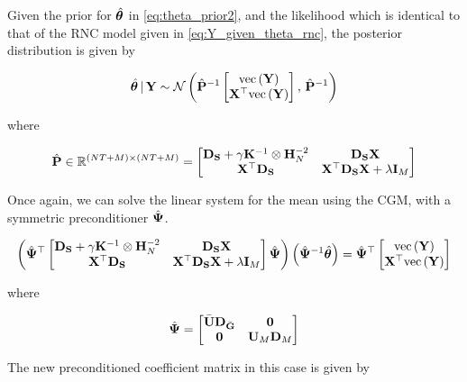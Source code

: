 Given the prior for $\hat{\boldsymbol{\theta}}$ in \cref{eq:theta_prior2}, and the likelihood which is identical to that of the RNC model given in \cref{eq:Y_given_theta_rnc}, the posterior distribution is given by 

\begin{equation}
    \hat{\boldsymbol{\theta}} \, | \, \mathbf{Y} \sim \mathcal{N}\left(\hat{\mathbf{P}}^{-1} \begin{bmatrix} \text{\textup{vec}}\left(\mathbf{Y}\right) \\ \mathbf{X}^\top \text{\textup{vec}}\left(\mathbf{Y}\right) \end{bmatrix}, \, \hat{\mathbf{P}}^{-1}\right)
\end{equation}

where 

\begin{equation}
    \hat{\mathbf{P}} \in \mathbb{R}^{(NT + M) \times (NT + M)}= 
    \begin{bmatrix}
     \mathbf{D}_{\mathbf{S}} + \gamma \mathbf{K}^{-1} \otimes \mathbf{H}_N^{-2} & \mathbf{D}_{\mathbf{S}}  \mathbf{X} \\
     \mathbf{X}^\top \mathbf{D}_{\mathbf{S}} & \mathbf{X}^\top \mathbf{D}_{\mathbf{S}} \mathbf{X} + \lambda \mathbf{I}_M   
    \end{bmatrix}
\end{equation}

Once again, we can solve the linear system for the mean using the CGM, with a symmetric preconditioner $\hat{\mathbf{\Psi}}$.  

\begin{equation}
    \left( \hat{\mathbf{\Psi}}^\top \begin{bmatrix}
        \mathbf{D}_{\mathbf{S}} + \gamma \mathbf{K}^{-1} \otimes \mathbf{H}_N^{-2} & \mathbf{D}_{\mathbf{S}}  \mathbf{X} \\
        \mathbf{X}^\top \mathbf{D}_{\mathbf{S}} & \mathbf{X}^\top \mathbf{D}_{\mathbf{S}} \mathbf{X} + \lambda \mathbf{I}_M   
       \end{bmatrix}  \hat{\mathbf{\Psi}} \right) \left( \hat{\mathbf{\Psi}}^{-1} \hat{\boldsymbol{\theta}}\right)   = \hat{\mathbf{\Psi}}^\top \begin{bmatrix} \text{\textup{vec}}\left(\mathbf{Y}\right) \\ \mathbf{X}^\top \text{\textup{vec}}\left(\mathbf{Y}\right) \end{bmatrix}
\end{equation}

where 

\begin{equation}
    \hat{\mathbf{\Psi}} =  \begin{bmatrix}
        \bar{\mathbf{U}} \mathbf{D}_{\bar{\mathbf{G}}} & \mathbf{0} \\
        \mathbf{0} & \mathbf{U}_M \mathbf{D}_M 
    \end{bmatrix}
\end{equation}

The new preconditioned coefficient matrix in this case is given by 

